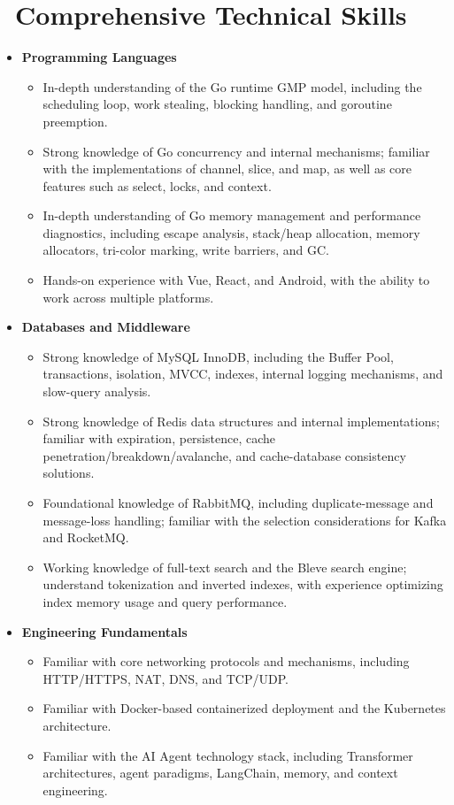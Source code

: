\documentclass{resume}
\begin{document}
\section{\faCogs\ Comprehensive Technical Skills}
\begin{itemize}
    \item \textbf{Programming Languages}
    \begin{itemize}
        \item In-depth understanding of the Go runtime GMP model, including the scheduling loop, work stealing, blocking handling, and goroutine preemption.
        \item Strong knowledge of Go concurrency and internal mechanisms; familiar with the implementations of channel, slice, and map, as well as core features such as select, locks, and context.
        \item In-depth understanding of Go memory management and performance diagnostics, including escape analysis, stack/heap allocation, memory allocators, tri-color marking, write barriers, and GC.
        \item Hands-on experience with Vue, React, and Android, with the ability to work across multiple platforms.
    \end{itemize}

    \item \textbf{Databases and Middleware}
    \begin{itemize}
        \item Strong knowledge of MySQL InnoDB, including the Buffer Pool, transactions, isolation, MVCC, indexes, internal logging mechanisms, and slow-query analysis.
        \item Strong knowledge of Redis data structures and internal implementations; familiar with expiration, persistence, cache penetration/breakdown/avalanche, and cache-database consistency solutions.
        \item Foundational knowledge of RabbitMQ, including duplicate-message and message-loss handling; familiar with the selection considerations for Kafka and RocketMQ.
        \item Working knowledge of full-text search and the Bleve search engine; understand tokenization and inverted indexes, with experience optimizing index memory usage and query performance.
    \end{itemize}

    \item \textbf{Engineering Fundamentals}
    \begin{itemize}
        \item Familiar with core networking protocols and mechanisms, including HTTP/HTTPS, NAT, DNS, and TCP/UDP.
        \item Familiar with Docker-based containerized deployment and the Kubernetes architecture.
        \item Familiar with the AI Agent technology stack, including Transformer architectures, agent paradigms, LangChain, memory, and context engineering.
    \end{itemize}


\end{itemize}
\end{document}
